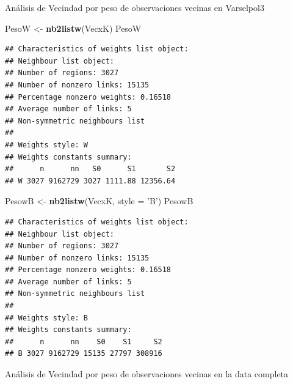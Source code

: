 \documentclass[11pt,]{article}
\newenvironment{Shaded}{\begin{snugshade}}{\end{snugshade}}
\newcommand{\KeywordTok}[1]{\textcolor[rgb]{0.13,0.29,0.53}{\textbf{#1}}}
\newcommand{\DataTypeTok}[1]{\textcolor[rgb]{0.13,0.29,0.53}{#1}}
\newcommand{\DecValTok}[1]{\textcolor[rgb]{0.00,0.00,0.81}{#1}}
\newcommand{\StringTok}[1]{\textcolor[rgb]{0.31,0.60,0.02}{#1}}
\newcommand{\OperatorTok}[1]{\textcolor[rgb]{0.81,0.36,0.00}{\textbf{#1}}}
\newcommand{\NormalTok}[1]{#1}
\begin{document}
Análisis de Vecindad por peso de observaciones vecinas en Varselpol3

\begin{Shaded}
\begin{Highlighting}[]
\NormalTok{PesoW <-}\StringTok{ }\KeywordTok{nb2listw}\NormalTok{(VecxK)}
\NormalTok{PesoW}
\end{Highlighting}
\end{Shaded}

\begin{verbatim}
## Characteristics of weights list object:
## Neighbour list object:
## Number of regions: 3027 
## Number of nonzero links: 15135 
## Percentage nonzero weights: 0.16518 
## Average number of links: 5 
## Non-symmetric neighbours list
## 
## Weights style: W 
## Weights constants summary:
##      n      nn   S0      S1       S2
## W 3027 9162729 3027 1111.88 12356.64
\end{verbatim}

\begin{Shaded}
\begin{Highlighting}[]
\NormalTok{PesowB <-}\StringTok{ }\KeywordTok{nb2listw}\NormalTok{(VecxK, }\DataTypeTok{style =} \StringTok{'B'}\NormalTok{)}
\NormalTok{PesowB}
\end{Highlighting}
\end{Shaded}

\begin{verbatim}
## Characteristics of weights list object:
## Neighbour list object:
## Number of regions: 3027 
## Number of nonzero links: 15135 
## Percentage nonzero weights: 0.16518 
## Average number of links: 5 
## Non-symmetric neighbours list
## 
## Weights style: B 
## Weights constants summary:
##      n      nn    S0    S1     S2
## B 3027 9162729 15135 27797 308916
\end{verbatim}

Análisis de Vecindad por peso de observaciones vecinas en la data
completa

\begin{Shaded}
\end{Shaded}
\end{document}
